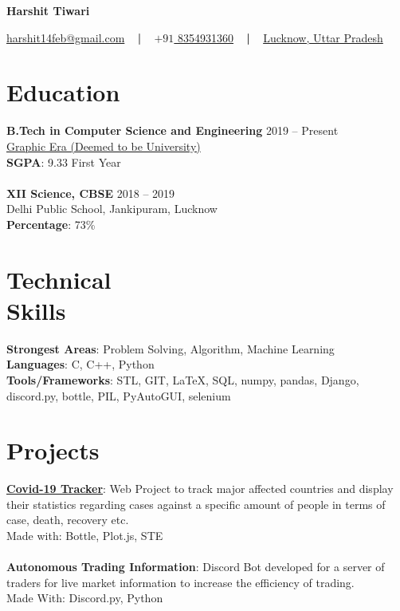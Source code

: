 \documentclass[margin, centered]{res}
\begin{document}
	\begin{center}
		\hspace{-\hoffset}
		\huge\bf{Harshit Tiwari}
	\end{center}
	\begin{center}
		\hspace{-\hoffset}
		\href{mailto:harshit14feb@gmail.com}{harshit14feb@gmail.com}
		~ \textbf{|} ~
		\href{tel:+919532655323}{\(+91\) 8354931360}
		~ \textbf{|} ~
		\href{https://goo.gl/maps/Sh5vC8Vo78Y3cWfr9}{Lucknow, Uttar Pradesh}
	\end{center}

	\begin{resume}
		\section{Education}
			\textbf{B.Tech in Computer Science and Engineering} \hfill 2019 – Present \\
			\href{https://www.geu.ac.in/}{Graphic Era (Deemed to be University)}\\
			\textbf{SGPA}: 9.33 First Year \\ 
			\\
			\textbf{XII Science, CBSE} \hfill 2018 – 2019 \\
			Delhi Public School, Jankipuram, Lucknow \\
			\textbf{Percentage}: 73\%
		
		\section{Technical \\ Skills}
			\textbf{Strongest Areas}: Problem Solving, Algorithm, Machine Learning\\
			\textbf{Languages}: C, C++, Python\\
			\textbf{Tools/Frameworks}: STL, GIT, \LaTeX, SQL, numpy, pandas, Django, discord.py, bottle, PIL, PyAutoGUI, selenium

		
		\section{Projects}
			\textbf{\href{https://github.com/FireFeathers06/covid-19}{Covid-19 Tracker}}:
			Web Project to track major affected countries and display their statistics regarding 
			cases against a specific amount of people in terms of case, death, recovery etc.\\
			Made with: Bottle, Plot.js, STE
			\\ \\
			\textbf{Autonomous Trading Information}:
			Discord Bot developed for a server of traders for live market information to increase the efficiency of trading.\\
			Made With: Discord.py, Python
			\\ \\
		

\end{resume}
\end{document}

